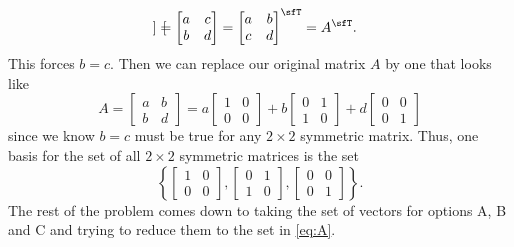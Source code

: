 \begin{questions}
\begin{solution}
\[\begin{bmatrix}
      \end{bmatrix}
      =
      \begin{bmatrix}
        a&c\\b&d
      \end{bmatrix}
      =
      \begin{bmatrix}
        a&b\\c&d
      \end{bmatrix}^{\sfT} =A^{\sfT}.
    \]
    This forces $b=c$. Then we can replace our original matrix $A$ by one
    that looks like
    \[
      A=\begin{bmatrix}
        a&b\\
        b&d
      \end{bmatrix}= a\begin{bmatrix}
        1&0\\
        0&0
      \end{bmatrix}+ b\begin{bmatrix}
        0&1\\
        1&0
      \end{bmatrix}+ d\begin{bmatrix}
        0&0\\
        0&1
      \end{bmatrix}
    \]
    since we know $b=c$ must be true for any $2\times 2$ symmetric matrix.
    Thus, one basis for the set of all $2\times 2$ symmetric matrices is
    the set
    \[
      \label{eq:A}
      \tag{$\bigstar$} \left\{
        \begin{bmatrix}1&0\\0&0\end{bmatrix},
        \begin{bmatrix}0&1\\1&0\end{bmatrix},
        \begin{bmatrix}0&0\\0&1\end{bmatrix} \right\}.
    \]
    The rest of the problem comes down to taking the set of vectors for
    options A, B and C and trying to reduce them to the set in
    \eqref{eq:A}.
  \end{solution}


\end{questions}
